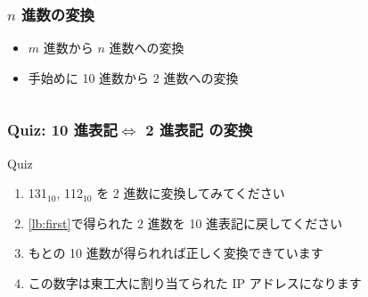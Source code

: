 \begin{frame}[label=Dec2Bin]
\frametitle{$n$ 進数の変換}
  \begin{itemize}
\item $m$ 進数から $n$ 進数への変換
\item 手始めに 10 進数から 2 進数への変換
  \end{itemize}
  \begin{center}
   \begin{example}[10進$\Leftrightarrow$2進]
   \begin{columns}[t]
    \begin{column}{3cm}
    \end{column}
    \begin{column}{3cm}
    \end{column}
   \end{columns}
   \end{example}
  \end{center}
\end{frame}
\begin{frame}
\frametitle{Quiz: 10 進表記$\Leftrightarrow$ 2 進表記 の変換}
  \begin{block}{Quiz}
    \begin{enumerate}
\item 131$_{10}$, 112$_{10}$ を 2 進数に変換してみてください\label{lb:first}
\item \ref{lb:first}で得られた 2 進数を 10 進表記に戻してください
\item もとの 10 進数が得られれば正しく変換できています
\item この数字は東工大に割り当てられた IP アドレスになります
    \end{enumerate}
  \end{block}
\end{frame}
%
%
%
%
